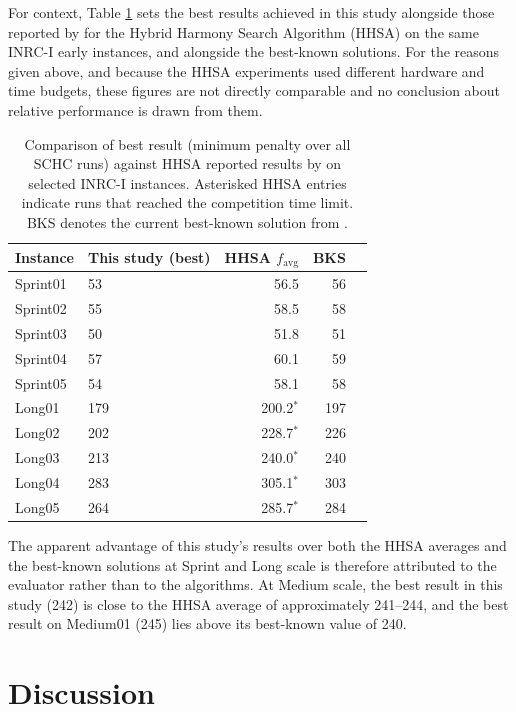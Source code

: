 \documentclass[12pt, a4paper, oneside]{report}
\begin{document}
For context, Table \ref{tab:hhsa_comparison} sets the best results
achieved in this study alongside those reported by
\citet{Awadallah2015} for the Hybrid Harmony Search Algorithm (HHSA)
on the same INRC-I early instances, and alongside the best-known
solutions. For the reasons given above, and because the HHSA
experiments used different hardware and time budgets, these figures
are not directly comparable and no conclusion about relative
performance is drawn from them.

\begin{table}[H]
\centering
\caption{Comparison of best result (minimum penalty over all SCHC runs)
against HHSA reported results by \citet{Awadallah2015} on selected
INRC-I instances. Asterisked HHSA entries indicate runs that reached
the competition time limit. BKS denotes the current best-known
solution from \citet{Toffolo2014}.}
\label{tab:hhsa_comparison}
\small
\begin{tabular}{llrrr}
\toprule
Instance & This study (best) & HHSA $f_{\text{avg}}$ & BKS \\
\midrule
Sprint01 & 53 & 56.5 & 56 \\
Sprint02 & 55 & 58.5 & 58 \\
Sprint03 & 50 & 51.8 & 51 \\
Sprint04 & 57 & 60.1 & 59 \\
Sprint05 & 54 & 58.1 & 58 \\
\midrule
Long01 & 179 & 200.2$^*$ & 197 \\
Long02 & 202 & 228.7$^*$ & 226 \\
Long03 & 213 & 240.0$^*$ & 240 \\
Long04 & 283 & 305.1$^*$ & 303 \\
Long05 & 264 & 285.7$^*$ & 284 \\
\bottomrule
\end{tabular}
\end{table}

The apparent advantage of this study's results over both the HHSA
averages and the best-known solutions at Sprint and Long scale is
therefore attributed to the evaluator rather than to the algorithms.
At Medium scale, the best result in this study (242) is close to the
HHSA average of approximately 241--244, and the best result on
Medium01 (245) lies above its best-known value of 240.

\chapter{Discussion}
\label{ch:discussion}
\end{document}

